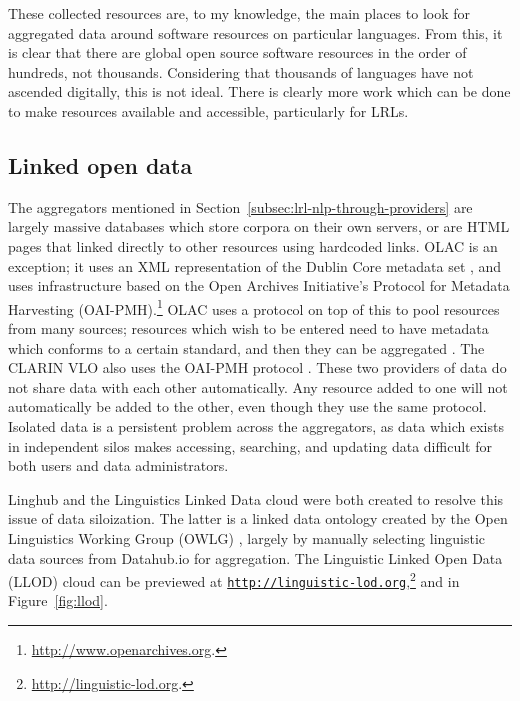 These collected resources are, to my knowledge, the main places to look for aggregated data around software resources on particular languages. From this, it is clear that there are global open source software resources in the order of hundreds, not thousands. Considering that thousands of languages have not ascended digitally, this is not ideal. There is clearly more work which can be done to make resources available and accessible, particularly for LRLs.

\subsection{Linked open data}
\label{subsec:lod}

The aggregators mentioned in Section~\ref{subsec:lrl-nlp-through-providers} are largely massive databases which store corpora on their own servers, or are HTML pages that linked directly to other resources using hardcoded links. OLAC is an exception; it uses an XML representation of the Dublin Core metadata set \citep{dublin1998dublin}, and uses infrastructure based on the Open Archives Initiative's Protocol for Metadata Harvesting (OAI-PMH).\footnote{\href{http://www.openarchives.org}{http://www.openarchives.org}. } OLAC uses a protocol on top of this to pool resources from many sources; resources which wish to be entered need to have metadata which conforms to a certain standard, and then they can be aggregated \citep{simons2001olac}. The CLARIN VLO \citep{mccrae2015one} also uses the OAI-PMH protocol \citep{sompel2004resource, mccrae2015reconciling}. These two providers of data do not share data with each other automatically. Any resource added to one will not automatically be added to the other, even though they use the same protocol. Isolated data is a persistent problem across the aggregators, as data which exists in independent silos makes accessing, searching, and updating data difficult for both users and data administrators.

Linghub and the Linguistics Linked Data cloud were both created to resolve this issue of data siloization. The latter is a linked data ontology created by the Open Linguistics Working Group (OWLG) \citep{chiarcos2011working, chiarcos2012open, chiarcos2013building, mccrae2016open}, largely by manually selecting linguistic data sources from Datahub.io for aggregation. The Linguistic Linked Open Data (LLOD) cloud \citep{chiarcos2012linking} can be previewed at \href{http://linguistic-lod.org}{\nolinkurl{http://linguistic-lod.org}},\footnote{\href{http://linguistic-lod.org/}{http://linguistic-lod.org}. } and in Figure~\ref{fig:llod}.

